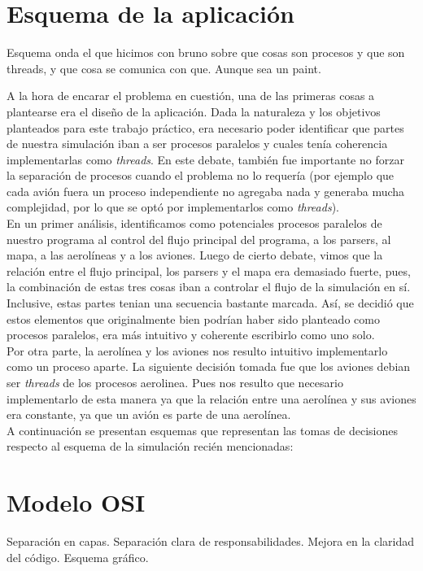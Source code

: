 \documentclass[a4paper,10pt]{article}
\begin{document}
\newpage
\section{Esquema de la aplicación}
Esquema onda el que hicimos con bruno sobre que cosas son procesos y que son threads, y que cosa se comunica con que. Aunque sea un paint.

A la hora de encarar el problema en cuestión, una de las primeras cosas a plantearse era el diseño de la aplicación. Dada la naturaleza y los objetivos planteados para este
 trabajo práctico, era necesario poder identificar que partes de nuestra simulación iban a ser procesos paralelos y cuales tenía coherencia implementarlas como \textit{threads}.
  En este debate, también fue importante no forzar la separación de procesos cuando el problema no lo requería (por ejemplo que cada avión fuera un proceso independiente no agregaba 
  nada y generaba mucha complejidad, por lo que se optó por implementarlos como \textit{threads}).\\ 

En un primer análisis, identificamos como potenciales procesos paralelos de nuestro programa al control del flujo principal del programa, a los parsers, al mapa, a las aerolíneas y
 a los aviones. Luego de cierto debate, vimos que la relación entre el flujo principal, los parsers y el mapa era demasiado fuerte, pues, la combinación de estas tres cosas iban a 
 controlar el flujo de la simulación en sí. Inclusive, estas partes tenian una secuencia bastante marcada. Así, se decidió que estos elementos que originalmente bien podrían haber 
 sido planteado como procesos paralelos, era más intuitivo y coherente escribirlo como uno solo.\\

Por otra parte, la aerolínea y los aviones nos resulto intuitivo implementarlo como un proceso aparte. La siguiente decisión tomada fue que los aviones debian ser \textit{threads}
 de los procesos aerolinea. Pues nos resulto que necesario implementarlo de esta manera ya que la relación entre una aerolínea y sus aviones era constante, ya que un avión es parte
  de una aerolínea.\\

A continuación se presentan esquemas que representan las tomas de decisiones respecto al esquema de la simulación recién mencionadas:

\newpage
\section{Modelo OSI}
Separación en capas. Separación clara de responsabilidades. Mejora en la claridad del código.
Esquema gráfico.
\end{document}

